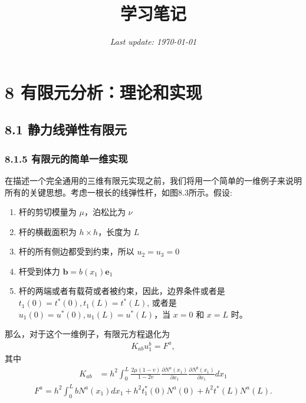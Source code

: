 \documentclass[12pt,a4paper]{book}
\title{\LARGE\bfseries\songti 学习笔记}
\date{\small\itshape Last update: \today}
\begin{document}
\songti

\maketitle 
\clearpage

\tableofcontents  
\clearpage




\clearpage
\chapter*{8 有限元分析：理论和实现}

\section*{8.1 静力线弹性有限元}


\subsection*{8.1.5 有限元的简单一维实现}


在描述一个完全通用的三维有限元实现之前，我们将用一个简单的一维例子来说明所有的关键思想。考虑一根长的线弹性杆，如图8.3所示。假设:

\begin{enumerate}
    \item 杆的剪切模量为 $\mu$，泊松比为 $\nu$
    \item 杆的横截面积为 $h\times h$，长度为 $L$
    \item 杆的所有侧边都受到约束，所以 $u_2=u_3=0$
    \item 杆受到体力 $\bm{b} = b(x_1) \bm{e}_1$
    \item 杆的两端或者有载荷或者被约束，因此，边界条件或者是 $t_1(0) = t^*(0), t_1(L) = t^*(L)$, 或者是 $u_1(0) = u^*(0), u_1(L) = u^*(L)$，当 $x=0$ 和 $x=L$ 时。
\end{enumerate}

那么，对于这个一维例子，有限元方程退化为
\begin{equation*}
    \begin{aligned}
        K_{ab} u_1^b = F^a,
    \end{aligned}
\end{equation*}
其中
\begin{equation*}
    \begin{aligned}
        K_{a b} & = h^{2} \int_{0}^{L} \frac{2 \mu(1-v)}{1-2 v} \frac{\partial N^{a}\left(x_{1}\right)}{\partial x_{1}} \frac{\partial N^{b}\left(x_{1}\right)}{\partial x_{1}} d x_{1}
    \end{aligned}
\end{equation*}
%
\begin{equation*}
    \begin{aligned}
        F^{a}=h^{2} \int_{0}^{L} b N^{a}\left(x_{1}\right) d x_{1}+h^{2} t_{1}^{*}(0) N^{a}(0)+h^{2} t^{*}(L) N^{a}(L) .
    \end{aligned}
\end{equation*}
\end{document}
